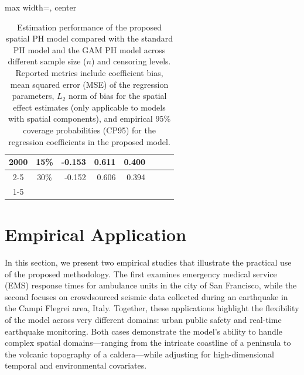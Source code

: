 \documentclass[11pt]{article}
\begin{document}
\begin{table}[h]
\begin{adjustbox}{max width=\textwidth, center}
\begin{tabular}{cc|rrrrll}
\multicolumn{1}{|c|}{\multirow{2}{*}{2000}} & 15\%                  & \multicolumn{1}{r|}{-0.153}                  & \multicolumn{1}{r|}{0.611}                   & \multicolumn{1}{r|}{0.400}                   & \multicolumn{1}{l}{}                           &                                              &                                              \\ \cline{2-5}
\multicolumn{1}{|c|}{}                      & 30\%                  & \multicolumn{1}{r|}{-0.152}                  & \multicolumn{1}{r|}{0.606}                   & \multicolumn{1}{r|}{0.394}                   & \multicolumn{1}{l}{}                           &                                              &                                              \\ \cline{1-5}
\end{tabular}
\end{adjustbox}
\endgroup  %
\caption{Estimation performance of the proposed spatial PH model compared with the standard PH model and the GAM PH model across different sample size ($n$) and censoring levels. Reported metrics include coefficient bias, mean squared error (MSE) of the regression parameters, $L_2$ norm of bias for the spatial effect estimates (only applicable to models with spatial components), and empirical 95\% coverage probabilities (CP95) for the regression coefficients in the proposed model.}
\label{tab:performance-metrics}
\end{table}

\FloatBarrier
\section{Empirical Application}\label{sec:empirical} In this section, we present two empirical studies that illustrate the practical use of the proposed methodology. The first examines emergency medical service (EMS) response times for ambulance units in the city of San Francisco, while the second focuses on crowdsourced seismic data collected during an earthquake in the Campi Flegrei area, Italy. Together, these applications highlight the flexibility of the model across very different domains: urban public safety and real-time earthquake monitoring. Both cases demonstrate the model's ability to handle complex spatial domains—ranging from the intricate coastline of a peninsula to the volcanic topography of a caldera—while adjusting for high-dimensional temporal and environmental covariates.
\end{document}
